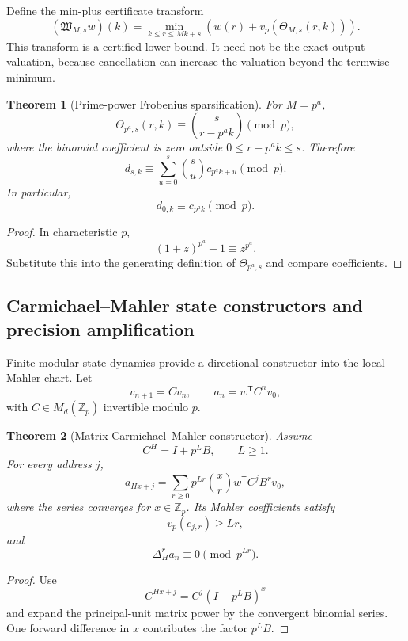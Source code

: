 \documentclass[11pt]{article}
\newtheorem{theorem}{Theorem}[section]
\theoremstyle{definition}
\theoremstyle{remark}
\begin{document}
Define the min-plus certificate transform
\[
 \boxed{
 (\mathfrak W_{M,s}w)(k)
 =
 \min_{k\leq r\leq Mk+s}
 \left(w(r)+v_p(\Theta_{M,s}(r,k))\right).}
\]
This transform is a certified lower bound.  It need not be the exact output valuation, because cancellation can increase the valuation beyond the termwise minimum.

\begin{theorem}[Prime-power Frobenius sparsification]
\label{thm:block08-frobenius-sparsity}
For \(M=p^a\),
\[
 \boxed{
 \Theta_{p^a,s}(r,k)
 \equiv
 \binom{s}{r-p^ak}
 \pmod p,}
\]
where the binomial coefficient is zero outside \(0\leq r-p^ak\leq s\).  Therefore
\[
 \boxed{
 d_{s,k}
 \equiv
 \sum_{u=0}^{s}\binom su c_{p^ak+u}
 \pmod p.}
\]
In particular,
\[
 \boxed{d_{0,k}\equiv c_{p^ak}\pmod p.}
\]
\end{theorem}

\begin{proof}
In characteristic \(p\),
\[
 (1+z)^{p^a}-1\equiv z^{p^a}.
\]
Substitute this into the generating definition of \(\Theta_{p^a,s}\) and compare coefficients.
\end{proof}

\subsection{Carmichael--Mahler state constructors and precision amplification}
\label{subsec:block08-carmichael}

Finite modular state dynamics provide a directional constructor into the local Mahler chart.  Let
\[
 v_{n+1}=Cv_n,
 \qquad
 a_n=w^{\mathsf T}C^nv_0,
\]
with \(C\in M_d(\mathbb Z_p)\) invertible modulo \(p\).

\begin{theorem}[Matrix Carmichael--Mahler constructor]
\label{thm:block08-matrix-carmichael}
Assume
\[
 C^H=I+p^LB,
 \qquad L\geq1.
\]
For every address \(j\),
\[
 \boxed{
 a_{Hx+j}
 =
 \sum_{r\geq0}
 p^{Lr}\binom xr
 w^{\mathsf T}C^jB^rv_0,}
\]
where the series converges for \(x\in\mathbb Z_p\).  Its Mahler coefficients satisfy
\[
 \boxed{v_p(c_{j,r})\geq Lr,}
\]
and
\[
 \boxed{\Delta_H^r a_n\equiv0\pmod{p^{Lr}}.}
\]
\end{theorem}

\begin{proof}
Use
\[
 C^{Hx+j}=C^j(I+p^LB)^x
\]
and expand the principal-unit matrix power by the convergent binomial series.  One forward difference in \(x\) contributes the factor \(p^LB\).
\end{proof}
\end{document}
